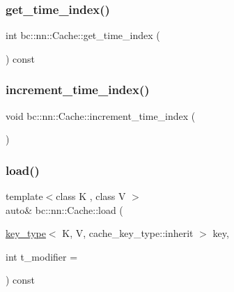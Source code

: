 \mbox{\label{structbc_1_1nn_1_1Cache_a39b3c45a4c4f14c02c190957329bd6dc}} 
\subsubsection{\texorpdfstring{get\+\_\+time\+\_\+index()}{get\_time\_index()}}
{\footnotesize\ttfamily int bc\+::nn\+::\+Cache\+::get\+\_\+time\+\_\+index (\begin{DoxyParamCaption}{ }\end{DoxyParamCaption}) const\hspace{0.3cm}{\ttfamily [inline]}}

\mbox{\label{structbc_1_1nn_1_1Cache_ae2fcde96a0ef66f8c3aa31e6f3125804}} 
\subsubsection{\texorpdfstring{increment\+\_\+time\+\_\+index()}{increment\_time\_index()}}
{\footnotesize\ttfamily void bc\+::nn\+::\+Cache\+::increment\+\_\+time\+\_\+index (\begin{DoxyParamCaption}{ }\end{DoxyParamCaption})\hspace{0.3cm}{\ttfamily [inline]}}

\mbox{\label{structbc_1_1nn_1_1Cache_a0234b2950dfb3bd7152090ce6ee4c521}} 
\subsubsection{\texorpdfstring{load()}{load()}\hspace{0.1cm}{\footnotesize\ttfamily [1/8]}}
{\footnotesize\ttfamily template$<$class K , class V $>$ \\
auto\& bc\+::nn\+::\+Cache\+::load (\begin{DoxyParamCaption}\item[{\hyperlink{structbc_1_1nn_1_1Cache_aedd77c5710dcb5f9edd8ecb3c3041048}{key\+\_\+type}$<$ K, V, cache\+\_\+key\+\_\+type\+::inherit $>$}]{key,  }\item[{int}]{t\+\_\+modifier = {} }\end{DoxyParamCaption}) const\hspace{0.3cm}{\ttfamily [inline]}}

